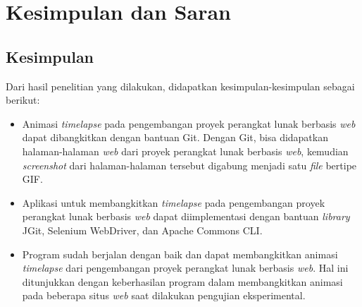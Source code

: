\chapter{Kesimpulan dan Saran}
\label{chap:kesimpulan_dan_saran}

\section{Kesimpulan}
\label{sec:kesimpulan}
Dari hasil penelitian yang dilakukan, didapatkan kesimpulan-kesimpulan sebagai berikut:
\begin{itemize}
\item Animasi \textit{timelapse} pada pengembangan proyek perangkat lunak berbasis \textit{web} dapat dibangkitkan dengan bantuan Git. Dengan Git, bisa didapatkan halaman-halaman \textit{web} dari proyek perangkat lunak berbasis \textit{web}, kemudian \textit{screenshot} dari halaman-halaman tersebut digabung menjadi satu \textit{file} bertipe GIF.
\item  Aplikasi untuk membangkitkan \textit{timelapse} pada pengembangan proyek perangkat lunak berbasis \textit{web} dapat diimplementasi dengan bantuan \textit{library} JGit, Selenium WebDriver, dan Apache Commons CLI.

\item Program sudah berjalan dengan baik dan dapat membangkitkan animasi \textit{timelapse} dari pengembangan proyek perangkat lunak berbasis \textit{web}. Hal ini ditunjukkan dengan keberhasilan program dalam membangkitkan animasi pada beberapa situs \textit{web} saat dilakukan pengujian eksperimental.








\end{itemize}
